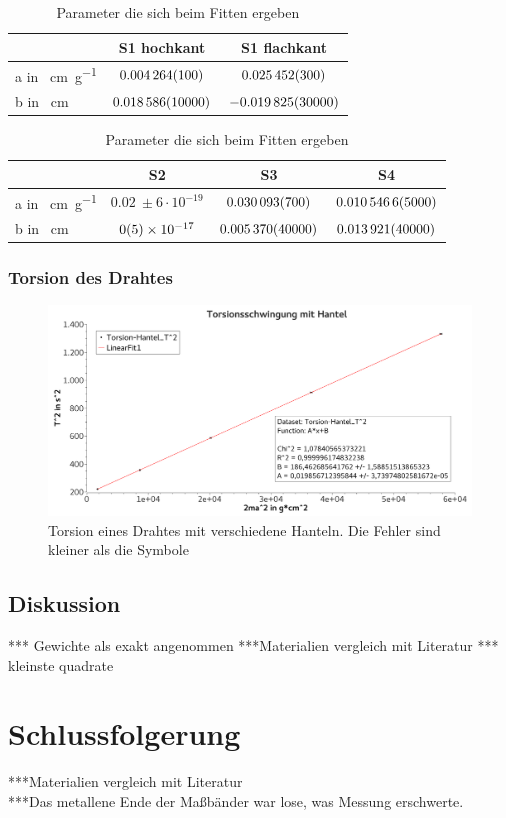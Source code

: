 \documentclass[
	a4paper,
	12pt,
	pagesize,
	ngerman
]{scrartcl}
\begin{document}
	\begin{table}[H]
	\centering
	\begin{tabular}{ l | c | c | }
		& S1 hochkant  & S1 flachkant  \\ \hline
		a in \SI{}{\centi\meter\per\gram} & $\SI{0,004264 \pm 0,0001}{}$& $ \SI{0,025452 \pm 0,0003}{}$\\ \hline
		b in \SI{}{\centi\meter} & $\SI{0,018586 \pm 0,01}{}$  & $\SI{-0,019825 \pm 0,03}{}$  \\ \hline
	\end{tabular}
	\caption{Parameter die sich beim Fitten ergeben}
	\label{TabelleFits}
	\end{table}


	\begin{table}[H]
	\centering
	\begin{tabular}{ l |  c | c | c |}
		& S2 & S3 & S4  \\ \hline
		a in \SI{}{\centi\meter\per\gram} &  $ \SI{0,02}{} \pm 6 \cdot 10^{-19}$ & $\SI{0,030093 \pm 0,0007}{}$ & $\SI{0,0105466 \pm 0,0005}{}$  \\ \hline
		b in \SI{}{\centi\meter} &  $\SI{0 \pm 5e-17}{}$ &  $\SI{0,005370 \pm 0,04}{}$&  $\SI{0,013921 \pm 0,04}{}$   \\ \hline
	\end{tabular}
	\caption{Parameter die sich beim Fitten ergeben}
	\label{TabelleFits}
	\end{table}
	\subsubsection{Torsion des Drahtes}
	\begin{figure}[H]
		\includegraphics[width=1\textwidth]{Torsion}
		\centering
		\caption{Torsion eines Drahtes mit verschiedene Hanteln. Die Fehler sind kleiner als die Symbole}
		\label{TorsionGraph}
		\centering
	\end{figure}


	
	\subsection{Diskussion}
	*** Gewichte als exakt angenommen
	***Materialien vergleich mit Literatur
	*** kleinste quadrate
	
	\section{Schlussfolgerung}
	***Materialien vergleich mit Literatur \\
	***Das metallene Ende der Maßbänder war lose, was Messung erschwerte.
	
\end{document}
